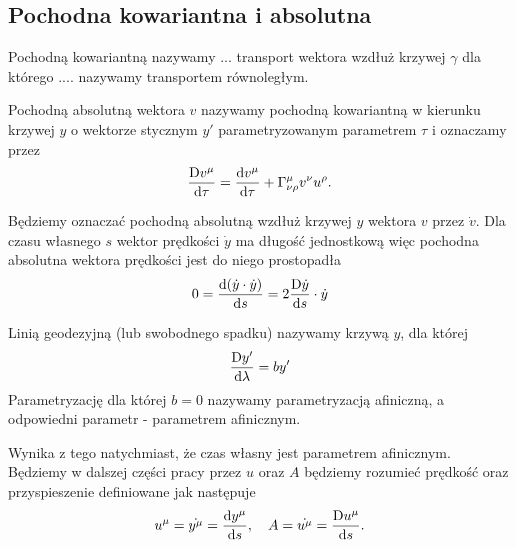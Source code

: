 \subsection{Pochodna kowariantna i absolutna}
\begin{definition}
Pochodną kowariantną nazywamy ...
transport wektora wzdłuż krzywej $\gamma$ dla którego 
.... nazywamy transportem równoległym.
\end{definition}
\begin{definition}
Pochodną absolutną wektora $v$ nazywamy pochodną kowariantną w 
kierunku krzywej $y$ o wektorze stycznym $y'$ 
parametryzowanym parametrem $\tau$ i oznaczamy przez
\begin{align}
\frac{\text{D} v^\mu }{\text{d} \tau } = \frac{\text{d} v^\mu}{\text{d} \tau}
+ \Gamma^\mu_{\nu\rho} v^\nu u^\rho.
\end{align}
\end{definition}
Będziemy oznaczać pochodną absolutną wzdłuż krzywej $y$ wektora $v$ 
przez $\dot{v}$. 
Dla czasu własnego $s$ wektor prędkości $\dot{y}$
 ma długość jednostkową 
więc pochodna absolutna wektora prędkości jest do niego prostopadła
\begin{align}
0 = \frac{\text{d} (\dot{y} \cdot \dot{y}) }{\text{d} s} = 
2 \frac{\text{D} \dot{y}}{\text{d} s} \cdot \dot{y}
\end{align}
\begin{definition}
Linią geodezyjną (lub swobodnego spadku) nazywamy krzywą $y$, dla której
\begin{align}
\frac{\text{D} y'}{\text{d} \lambda } = b y'
\end{align} 
Parametryzację dla której $b=0$ nazywamy parametryzacją afiniczną,
a odpowiedni parametr - parametrem afinicznym.
\end{definition}
Wynika z tego natychmiast, że czas własny jest parametrem afinicznym.
Będziemy w dalszej części pracy przez $u$ oraz $A$ będziemy rozumieć 
prędkość oraz przyspieszenie definiowane jak następuje
\begin{align}
u^\mu = \dot{y^\mu} = \frac{\text{d} y^\mu}{\text{d} s}, 
\quad A = \dot{u^\mu} =  \frac{\text{D} u^\mu}{\text{d} s}.
\end{align}




